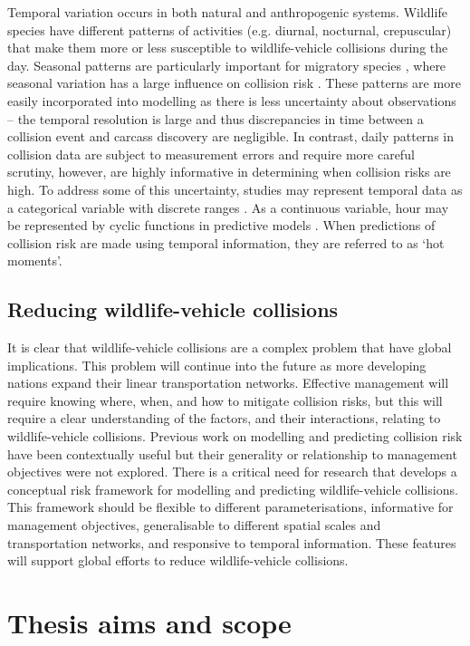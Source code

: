 Temporal variation occurs in both natural and anthropogenic systems. Wildlife species have different patterns of activities (e.g. diurnal, nocturnal, crepuscular) that make them more or less susceptible to wildlife-vehicle collisions during the day. Seasonal patterns are particularly important for migratory species \citep{hick85,bern92}, where seasonal variation has a large influence on collision risk \citep{shep08}. These patterns are more easily incorporated into modelling as there is less uncertainty about observations -- the temporal resolution is large and thus discrepancies in time between a collision event and carcass discovery are negligible. In contrast, daily patterns in collision data are subject to measurement errors and require more careful scrutiny, however, are highly informative in determining when collision risks are high. To address some of this uncertainty, studies may represent temporal data as a categorical variable \citep{mizu14} with discrete ranges \citep{rowd08}. As a continuous variable, hour may be represented by cyclic functions in predictive models \citep{neum12,thur15}. When predictions of collision risk are made using temporal information, they are referred to as `hot moments'.

\subsection{Reducing wildlife-vehicle collisions}

It is clear that wildlife-vehicle collisions are a complex problem that have global implications. This problem will continue into the future as more developing nations expand their linear transportation networks. Effective management will require knowing where, when, and how to mitigate collision risks, but this will require a clear understanding of the factors, and their interactions, relating to wildlife-vehicle collisions. Previous work on modelling and predicting collision risk have been contextually useful but their generality or relationship to management objectives were not explored. There is a critical need for research that develops a conceptual risk framework for modelling and predicting wildlife-vehicle collisions. This framework should be flexible to different parameterisations, informative for management objectives, generalisable to different spatial scales and transportation networks, and responsive to temporal information. These features will support global efforts to reduce wildlife-vehicle collisions.

\section{Thesis aims and scope}

